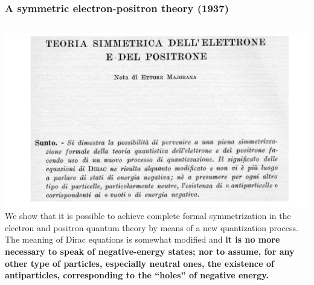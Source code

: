 \begin{frame}
\frametitle{A symmetric electron-positron theory (1937)}
\begin{columns}
\includegraphics[scale=0.32]{img/MajoranaPaper.png}
We show that it is possible to achieve complete formal symmetrization in the electron and positron quantum theory by means of a new quantization process. The meaning of Dirac equations is somewhat modified and {\bf it is no more necessary to speak of negative-energy states; nor to assume, for any other type of particles, especially neutral ones, the existence of antiparticles, corresponding to the ``holes'' of negative energy.}
\end{columns}
\end{frame}

